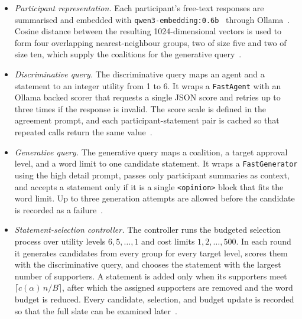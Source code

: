 \documentclass[letterpaper,11pt]{article}
\theoremstyle{plain}
\theoremstyle{definition}
\begin{document}
\begin{itemize}
\item \emph{Participant representation.}
Each participant's free-text responses are summarised and embedded with \texttt{qwen3-embedding:0.6b}~\citep{yang2025qwen3} through Ollama~\citep{ollama2026}. Cosine distance between the resulting 1024-dimensional vectors is used to form four overlapping nearest-neighbour groups, two of size five and two of size ten, which supply the coalitions for the generative query~\citep{boehmer2025nextgen}. \smallskip

\item \emph{Discriminative query.}
The discriminative query maps an agent and a statement to an integer utility from 1 to 6. It wraps a \texttt{FastAgent} with an Ollama backed scorer that requests a single JSON score and retries up to three times if the response is invalid. The score scale is defined in the agreement prompt, and each participant-statement pair is cached so that repeated calls return the same value~\citep{fish2026gsc}. \smallskip

\item \emph{Generative query.}
The generative query maps a coalition, a target approval level, and a word limit to one candidate statement. It wraps a \texttt{FastGenerator} using the high detail prompt, passes only participant summaries as context, and accepts a statement only if it is a single \texttt{<opinion>} block that fits the word limit. Up to three generation attempts are allowed before the candidate is recorded as a failure~\citep{boehmer2025nextgen}. \smallskip

\item \emph{Statement-selection controller.}
The controller runs the budgeted selection process over utility levels $6,5,\dots,1$ and cost limits $1,2,\dots,500$. In each round it generates candidates from every group for every target level, scores them with the discriminative query, and chooses the statement with the largest number of supporters. A statement is added only when its supporters meet $\lceil c(\alpha)\,n/B\rceil$, after which the assigned supporters are removed and the word budget is reduced. Every candidate, selection, and budget update is recorded so that the full slate can be examined later~\citep{boehmer2025nextgen}.
\end{itemize}
\end{document}
